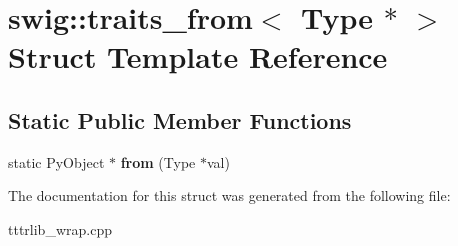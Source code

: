 \hypertarget{structswig_1_1traits__from_3_01_type_01_5_01_4}{}\section{swig\+:\+:traits\+\_\+from$<$ Type $\ast$ $>$ Struct Template Reference}
\label{structswig_1_1traits__from_3_01_type_01_5_01_4}
\subsection*{Static Public Member Functions}
\begin{DoxyCompactItemize}
\item 
\mbox{\label{structswig_1_1traits__from_3_01_type_01_5_01_4_a9df365d214884ed1c08f71211f5925ad}} 
static Py\+Object $\ast$ {\bfseries from} (Type $\ast$val)
\end{DoxyCompactItemize}


The documentation for this struct was generated from the following file\+:\begin{DoxyCompactItemize}
\item 
tttrlib\+\_\+wrap.\+cpp\end{DoxyCompactItemize}
